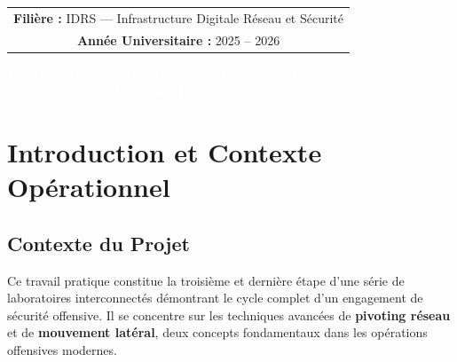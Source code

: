 \documentclass[12pt,a4paper,openany]{report}
\newif\ifshowpagenumbers
\newcommand{\hidepagenumbers}{\showpagenumbersfalse\pagestyle{empty}}
\newcommand{\showpagenumbers}{\showpagenumberstrue\pagestyle{fancy}}
\begin{document}
\begin{titlepage}
{\begin{tabular}{c}
				\textbf{\color{primary}Filière :} IDRS --- Infrastructure Digitale Réseau et Sécurité \\[0.3cm]
				\textbf{\color{primary}Année Universitaire :} 2025 -- 2026 \\
			\end{tabular}
		}
		
		\vfill
		
		\noindent
		\colorbox{primary}{%
			\parbox{\dimexpr\textwidth-2\fboxsep}{%
				\vspace{0.35cm}
				\centering
				{\small\textcolor{white}{%
						Metasploit Framework 6.4
						\quad\textbullet\quad Meterpreter
						\quad\textbullet\quad Ubuntu 25.04}}\\[0.2cm]
				{\small\textcolor{white}{%
						Parrot Security OS
						\quad\textbullet\quad Windows XP SP3
						\quad\textbullet\quad pfSense 2.8.0}}\\[0.35cm]
			}%
		}%
	\end{titlepage}
	
	\hidepagenumbers
	
	\tableofcontents
	\newpage
	\listoffigures
	\listoftables
	\newpage
	
	\cleardoublepage
	\showpagenumbers
	\setcounter{page}{1}
	
	
	\chapter{Introduction et Contexte Opérationnel}
	
	\section{Contexte du Projet}
	
	Ce travail pratique constitue la troisième et dernière étape d'une série de laboratoires interconnectés démontrant le cycle complet d'un engagement de sécurité offensive. Il se concentre sur les techniques avancées de \textbf{pivoting réseau} et de \textbf{mouvement latéral}, deux concepts fondamentaux dans les opérations offensives modernes.
	
\end{document}
